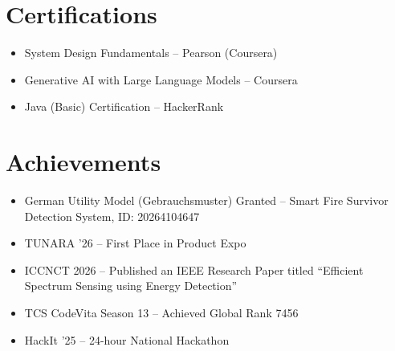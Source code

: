 \documentclass[letterpaper,10.5pt]{article}
\begin{document}
\section{Certifications}
\begin{itemize}[leftmargin=0.15in,itemsep=2pt]
\item System Design Fundamentals -- Pearson (Coursera)
\item Generative AI with Large Language Models -- Coursera
\item Java (Basic) Certification -- HackerRank

\end{itemize}

\section{Achievements}
\begin{itemize}[leftmargin=0.15in,itemsep=2pt]
\item German Utility Model (Gebrauchsmuster) Granted -- Smart Fire Survivor Detection System, ID: 20264104647
\item TUNARA '26 -- First Place in Product Expo
\item ICCNCT 2026 -- Published an IEEE Research Paper titled ``Efficient Spectrum Sensing using Energy Detection''
\item TCS CodeVita Season 13 -- Achieved Global Rank 7456
\item HackIt '25 -- 24-hour National Hackathon
\end{itemize}
\end{document}
